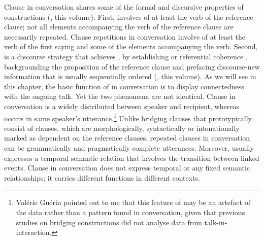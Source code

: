 \documentclass[output=paper]{LSP/langsci}
\begin{document}
Clause  in  conversation shares some of the formal and discursive properties of  constructions (\citealt[cf.][]{guerin18}, this volume). First,  involves  of at least the verb of the reference clause; not all elements accompanying the verb of the reference clause are necessarily repeated. Clause repetitions in  conversation involve  of at least the verb of the first saying and some of the elements accompanying the verb. Second,  is a discourse strategy that achieves , by establishing  or referential coherence \citep{devries.2005}, backgrounding the proposition of the reference clause and prefacing discourse-new information that is usually sequentially ordered (\citealt[][]{guerin18}, this volume). As we will see in this chapter, the basic function of  in  conversation is to display connectedness with the ongoing talk. Yet the two phenomena are not identical. Clause  in  conversation is a  widely distributed between speaker and recipient, whereas  occurs in same speaker’s utterance.\footnote{Valérie Guérin pointed out to me that this feature of  may be an artefact of the data rather than a pattern found in conversation, given that previous studies on bridging constructions did not analyse data from talk-in-interaction.} Unlike bridging clauses that prototypically consist of clauses, which are morphologically, syntactically or intonationally marked as dependent on the reference clauses, repeated clauses in  conversation can be grammatically and pragmatically complete utterances. Moreover,  usually expresses a temporal semantic relation that involves the transition between linked events. Clause  in  conversation does not express temporal  or any fixed semantic relationships; it carries different functions in different contexts.  
\end{document}

